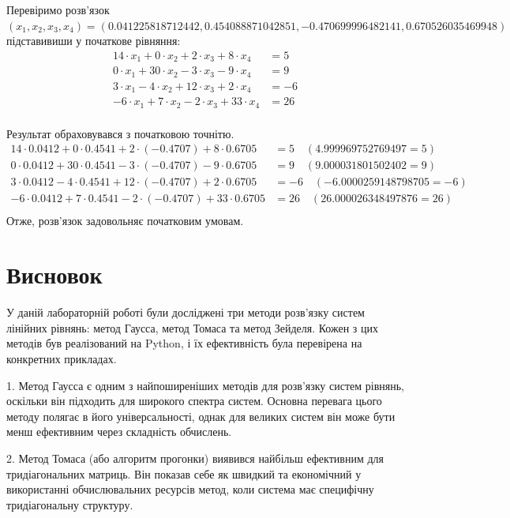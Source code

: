 \documentclass[a4paper, 12pt]{article}
\begin{document}
Перевіримо розв'язок \\
\((x_1, x_2, x_3, x_4) = (0.041225818712442, 0.454088871042851, -0.470699996482141, 0.670526035469948)\) підставивиши у початкове рівняння: 
\[ 
\begin{aligned}
14 \cdot x_1 + 0 \cdot x_2 + 2 \cdot x_3 + 8 \cdot x_4 &= 5 \\
 0 \cdot x_1 + 30 \cdot x_2 - 3 \cdot x_3 - 9 \cdot x_4 &= 9 \\
 3 \cdot x_1 - 4 \cdot x_2 + 12 \cdot x_3 + 2 \cdot x_4 &= -6 \\
 -6 \cdot x_1 + 7 \cdot x_2 - 2 \cdot x_3 + 33 \cdot x_4 &= 26 \\
 \end{aligned} \] 

 Результат обраховувався з початковою точнітю.
 \[ 
 \begin{aligned}
 14 \cdot 0.0412 + 0 \cdot 0.4541 + 2 \cdot (-0.4707) + 8 \cdot 0.6705 &= 5 \quad (4.999969752769497 = 5) \\
 0 \cdot 0.0412 + 30 \cdot 0.4541 - 3 \cdot (-0.4707) - 9 \cdot 0.6705 &= 9 \quad (9.000031801502402 = 9) \\
 3 \cdot 0.0412 - 4 \cdot 0.4541 + 12 \cdot (-0.4707) + 2 \cdot 0.6705 &= -6 \quad (-6.0000259148798705 = -6) \\
 -6 \cdot 0.0412 + 7 \cdot 0.4541 - 2 \cdot (-0.4707) + 33 \cdot 0.6705 &= 26 \quad (26.000026348497876 = 26) \\
 \end{aligned}
\]
Отже, розв'язок задовольняє початковим умовам.

\newpage
\section{Висновок}

У даній лабораторній роботі були досліджені три методи розв'язку систем
лінійних рівнянь: метод Гаусса, метод Томаса та метод Зейделя. Кожен з цих
методів був реалізований на Python, і їх ефективність була перевірена на
конкретних прикладах.

1. Метод Гаусса є одним з найпоширеніших методів для розв'язку систем
рівнянь, оскільки він підходить для широкого спектра систем. Основна перевага
цього методу полягає в його універсальності, однак для великих систем він може
бути менш ефективним через складність обчислень.

2. Метод Томаса (або алгоритм прогонки) виявився найбільш ефективним для
тридіагональних матриць. Він показав себе як швидкий та економічний у
використанні обчислювальних ресурсів метод, коли система має специфічну
тридіагональну структуру.
\end{document}
